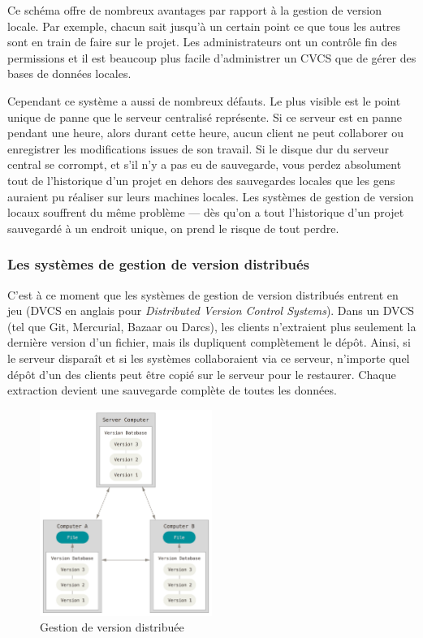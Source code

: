 Ce schéma offre de nombreux avantages par rapport à la gestion de version locale.
Par exemple, chacun sait jusqu'à un certain point ce que tous les autres sont en train de faire sur le projet.
Les administrateurs ont un contrôle fin des permissions et il est beaucoup plus facile d'administrer un CVCS que de gérer des bases de données locales.

Cependant ce système a aussi de nombreux défauts.
Le plus visible est le point unique de panne que le serveur centralisé représente.
Si ce serveur est en panne pendant une heure, alors durant cette heure, aucun client ne peut collaborer ou enregistrer les modifications issues de son travail.
Si le disque dur du serveur central se corrompt, et s'il n'y a pas eu de sauvegarde, vous perdez absolument tout de l'historique d'un projet en dehors des sauvegardes locales que les gens auraient pu réaliser sur leurs machines locales.
Les systèmes de gestion de version locaux souffrent du même problème  --- dès qu'on a tout l'historique d'un projet sauvegardé à un endroit unique, on prend le risque de tout perdre.

\subsubsection{Les systèmes de gestion de version distribués}

C'est à ce moment que les systèmes de gestion de version distribués entrent en jeu (DVCS en anglais pour \emph{Distributed Version Control Systems}).
Dans un DVCS (tel que Git, Mercurial, Bazaar ou Darcs), les clients n'extraient plus seulement la dernière version d'un fichier, mais ils dupliquent complètement le dépôt.
Ainsi, si le serveur disparaît et si les systèmes collaboraient via ce serveur, n'importe quel dépôt d'un des clients peut être copié sur le serveur pour le restaurer.
Chaque extraction devient une sauvegarde complète de toutes les données.

\begin{figure}[H]
  \centering
  \includegraphics[width=0.5\textwidth,keepaspectratio]{images/distributed}
  \caption{Gestion de version distribuée}
  \label{fig:git:distributed}
\end{figure}

